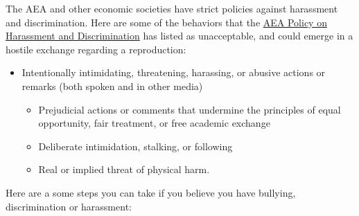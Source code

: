 \documentclass[]{book}
\providecommand{\tightlist}{%
  \setlength{\itemsep}{0pt}\setlength{\parskip}{0pt}}
\begin{document}
The AEA and other economic societies have strict policies against harassment and discrimination. Here are some of the behaviors that the \href{https://www.aeaweb.org/about-aea/aea-policy-harassment-discrimination}{AEA Policy on Harassment and Discrimination} has listed as unacceptable, and could emerge in a hostile exchange regarding a reproduction:

\begin{itemize}
\tightlist
\item
  Intentionally intimidating, threatening, harassing, or abusive actions or remarks (both spoken and in other media)

  \begin{itemize}
  \tightlist
  \item
    Prejudicial actions or comments that undermine the principles of equal opportunity, fair treatment, or free academic exchange
  \item
    Deliberate intimidation, stalking, or following
  \item
    Real or implied threat of physical harm.
  \end{itemize}
\end{itemize}

Here are a some steps you can take if you believe you have bullying, discrimination or harassment:
\end{document}
